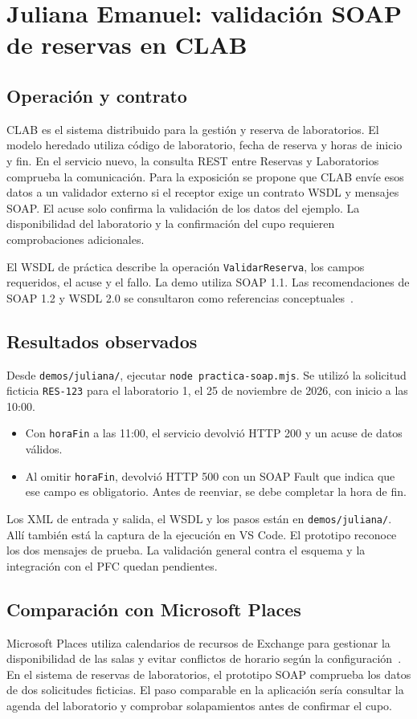 \section{Juliana Emanuel: validación SOAP de reservas en CLAB}

\subsection{Operación y contrato}
CLAB es el sistema distribuido para la gestión y reserva de laboratorios. El modelo heredado utiliza código de laboratorio, fecha de reserva y horas de inicio y fin. En el servicio nuevo, la consulta REST entre Reservas y Laboratorios comprueba la comunicación. Para la exposición se propone que CLAB envíe esos datos a un validador externo si el receptor exige un contrato WSDL y mensajes SOAP. El acuse solo confirma la validación de los datos del ejemplo. La disponibilidad del laboratorio y la confirmación del cupo requieren comprobaciones adicionales.

El WSDL de práctica describe la operación \texttt{ValidarReserva}, los campos requeridos, el acuse y el fallo. La demo utiliza SOAP 1.1. Las recomendaciones de SOAP 1.2 y WSDL 2.0 se consultaron como referencias conceptuales~\cite{w3c-soap12-juliana,w3c-wsdl20-juliana}.

\subsection{Resultados observados}
Desde \texttt{demos/juliana/}, ejecutar \texttt{node practica-soap.mjs}. Se utilizó la solicitud ficticia \texttt{RES-123} para el laboratorio 1, el 25 de noviembre de 2026, con inicio a las 10:00.
\begin{itemize}
  \item Con \texttt{horaFin} a las 11:00, el servicio devolvió HTTP 200 y un acuse de datos válidos.
  \item Al omitir \texttt{horaFin}, devolvió HTTP 500 con un SOAP Fault que indica que ese campo es obligatorio. Antes de reenviar, se debe completar la hora de fin.
\end{itemize}
Los XML de entrada y salida, el WSDL y los pasos están en \texttt{demos/juliana/}. Allí también está la captura de la ejecución en VS Code. El prototipo reconoce los dos mensajes de prueba. La validación general contra el esquema y la integración con el PFC quedan pendientes.

\subsection{Comparación con Microsoft Places}
Microsoft Places utiliza calendarios de recursos de Exchange para gestionar la disponibilidad de las salas y evitar conflictos de horario según la configuración~\cite{microsoft-places-salas-2026}. En el sistema de reservas de laboratorios, el prototipo SOAP comprueba los datos de dos solicitudes ficticias. El paso comparable en la aplicación sería consultar la agenda del laboratorio y comprobar solapamientos antes de confirmar el cupo.

